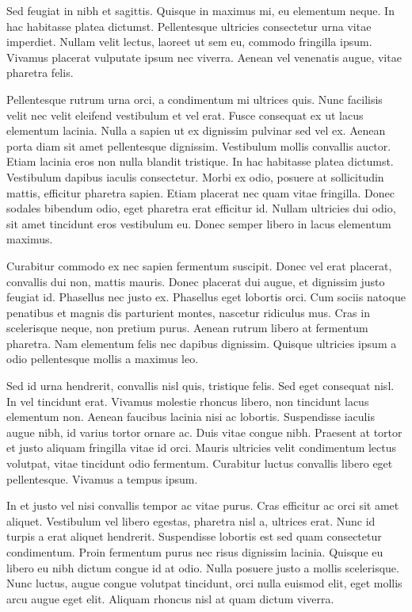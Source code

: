 Sed feugiat in nibh et sagittis. Quisque in maximus mi, eu elementum neque. In hac habitasse platea dictumst. Pellentesque ultricies consectetur urna vitae imperdiet. Nullam velit lectus, laoreet ut sem eu, commodo fringilla ipsum. Vivamus placerat vulputate ipsum nec viverra. Aenean vel venenatis augue, vitae pharetra felis.

Pellentesque rutrum urna orci, a condimentum mi ultrices quis. Nunc facilisis velit nec velit eleifend vestibulum et vel erat. Fusce consequat ex ut lacus elementum lacinia. Nulla a sapien ut ex dignissim pulvinar sed vel ex. Aenean porta diam sit amet pellentesque dignissim. Vestibulum mollis convallis auctor. Etiam lacinia eros non nulla blandit tristique. In hac habitasse platea dictumst. Vestibulum dapibus iaculis consectetur. Morbi ex odio, posuere at sollicitudin mattis, efficitur pharetra sapien. Etiam placerat nec quam vitae fringilla. Donec sodales bibendum odio, eget pharetra erat efficitur id. Nullam ultricies dui odio, sit amet tincidunt eros vestibulum eu. Donec semper libero in lacus elementum maximus.

Curabitur commodo ex nec sapien fermentum suscipit. Donec vel erat placerat, convallis dui non, mattis mauris. Donec placerat dui augue, et dignissim justo feugiat id. Phasellus nec justo ex. Phasellus eget lobortis orci. Cum sociis natoque penatibus et magnis dis parturient montes, nascetur ridiculus mus. Cras in scelerisque neque, non pretium purus. Aenean rutrum libero at fermentum pharetra. Nam elementum felis nec dapibus dignissim. Quisque ultricies ipsum a odio pellentesque mollis a maximus leo.

Sed id urna hendrerit, convallis nisl quis, tristique felis. Sed eget consequat nisl. In vel tincidunt erat. Vivamus molestie rhoncus libero, non tincidunt lacus elementum non. Aenean faucibus lacinia nisi ac lobortis. Suspendisse iaculis augue nibh, id varius tortor ornare ac. Duis vitae congue nibh. Praesent at tortor et justo aliquam fringilla vitae id orci. Mauris ultricies velit condimentum lectus volutpat, vitae tincidunt odio fermentum. Curabitur luctus convallis libero eget pellentesque. Vivamus a tempus ipsum.

In et justo vel nisi convallis tempor ac vitae purus. Cras efficitur ac orci sit amet aliquet. Vestibulum vel libero egestas, pharetra nisl a, ultrices erat. Nunc id turpis a erat aliquet hendrerit. Suspendisse lobortis est sed quam consectetur condimentum. Proin fermentum purus nec risus dignissim lacinia. Quisque eu libero eu nibh dictum congue id at odio. Nulla posuere justo a mollis scelerisque. Nunc luctus, augue congue volutpat tincidunt, orci nulla euismod elit, eget mollis arcu augue eget elit. Aliquam rhoncus nisl at quam dictum viverra.

